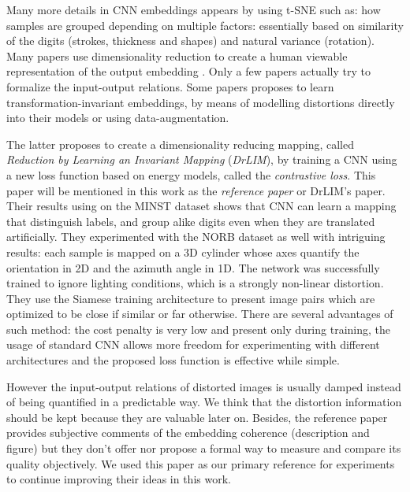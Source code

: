 \documentclass[a4paper,12pt]{report}
\begin{document}
Many more details in CNN embeddings appears by using t-SNE such as: how samples are grouped depending on multiple factors: essentially based on similarity of the digits (strokes, thickness and shapes) and natural variance (rotation).
Many papers use dimensionality reduction to create a human viewable representation of the output embedding \cite{donahue2013decaf}\cite{yu2014visualizing}\cite{yaotiny}.
Only a few papers actually try to formalize the input-output relations\cite{goodfellow2009measuring}.
Some papers proposes to learn transformation-invariant embeddings, by means of modelling distortions directly into their models\cite{gens2014deep} or using data-augmentation\cite{hadsell2006dimensionality}.

The latter proposes to create a dimensionality reducing mapping, called {\em Reduction by Learning an Invariant Mapping} ({\em DrLIM}), by training a CNN using a new loss function based on energy models, called the {\em contrastive loss}.
This paper will be mentioned in this work as the {\em reference paper} or DrLIM's paper.
Their results using on the MINST dataset\cite{lecun1998mnist} shows that CNN can learn a mapping that distinguish labels, and group alike digits even when they are translated artificially.
They experimented with the NORB dataset\cite{lecun2004learning} as well with intriguing results: each sample is mapped on a 3D cylinder whose axes quantify the orientation in 2D and the azimuth angle in 1D.
The network was successfully trained to ignore lighting conditions, which is a strongly non-linear distortion.
They use the Siamese training architecture to present image pairs which are optimized to be close if similar or far otherwise\cite{bromley1993signature}\cite{chopra2005learning}.
There are several advantages of such method: the cost penalty is very low and present only during training, the usage of standard CNN allows more freedom for experimenting with different architectures and the proposed loss function is effective while simple.

However the input-output relations of distorted images is usually damped instead of being quantified in a predictable way.
We think that the distortion information should be kept because they are valuable later on.
Besides, the reference paper provides subjective comments of the embedding coherence (description and figure) but they don't offer nor propose a formal way to measure and compare its quality objectively.
We used this paper as our primary reference for experiments to continue improving their ideas in this work.
\end{document}
